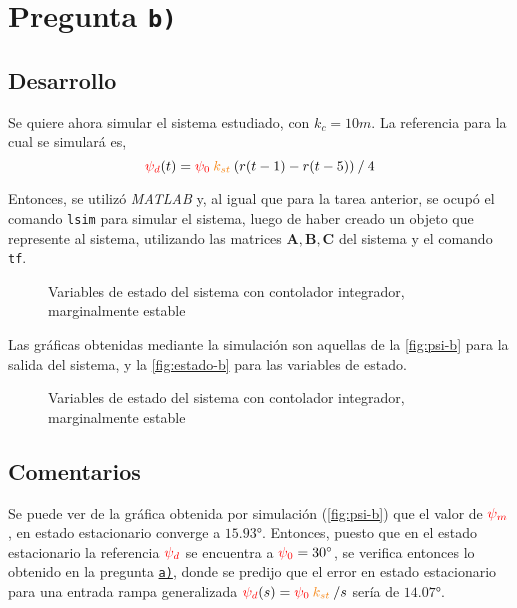 \section{Pregunta \texttt{b)}}\label{pregunta-b}

\subsection{Desarrollo}

Se quiere ahora simular el sistema estudiado, con $k_{c} = 10\unit{m}$.
La referencia para la cual se simulará es,
\begin{equation}
  \rojo{\psi_{d}}(t) = \rojo{\psi_{0}}\nara{k_{st}}\left(r(t-1) - r(t-5)\right) \mathbin{/} 4
  \label{eq:referencia}
\end{equation}

Entonces, se utilizó \textit{MATLAB} y, al igual que para la tarea anterior,
se ocupó el comando \verb|lsim| para simular el sistema, luego de haber
creado un objeto que represente al sistema, utilizando las matrices
$\mathbf{A}, \mathbf{B}, \mathbf{C}$ del sistema y el comando \verb|tf|.

\begin{figure}[ht]
  \centering
  
  \caption{Variables de estado del sistema con contolador integrador, marginalmente estable}
  \label{fig:psi-b}
\end{figure}

Las gráficas obtenidas mediante la simulación son aquellas de la \autoref{fig:psi-b} para
la salida del sistema, y la \autoref{fig:estado-b} para las variables de estado.

\begin{figure}[ht]
  \centering
  
  \caption{Variables de estado del sistema con contolador integrador, marginalmente estable}
  \label{fig:estado-b}
\end{figure}

\subsection{Comentarios}

Se puede ver de la gráfica obtenida por simulación (\autoref{fig:psi-b}) que el
valor de $\mathbin{\color{red}\psi_{m}}$, en estado estacionario converge a $\ang{15.93}$.
Entonces, puesto que en el estado estacionario la referencia $\mathbin{\color{red}\psi_{d}}$
se encuentra a $\mathbin{\color{red}\psi_{0}} = \ang{30}$, se verifica entonces lo obtenido en
la pregunta \hyperref[pregunta-a]{\texttt{a)}}, donde se predijo que el error en
estado estacionario para una entrada rampa generalizada
$\rojo{\psi_{d}}(s) = \rojo{\psi_{0}}\nara{k_{st}}\mathbin{/}s$ sería de $\ang{14.07}$.

